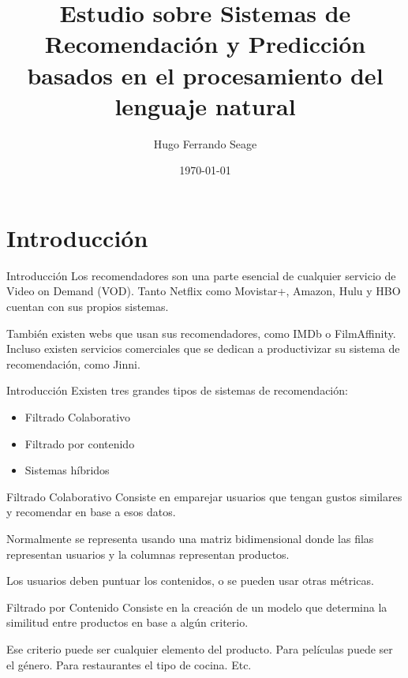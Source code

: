 \documentclass[table]{beamer}
\title{Estudio sobre Sistemas de Recomendación y Predicción basados en el procesamiento del lenguaje natural}
\date{\today}
\author{Hugo Ferrando Seage}
\institute{Universidad Europea de Madrid\\Escuela de Arquitectura, Ingeniería y Diseño}
\begin{document}
  \maketitle

  \section{Introducción}
  \begin{frame}{Introducción}
      Los recomendadores son una parte esencial de cualquier servicio de Video on Demand (VOD). Tanto Netflix como Movistar+, Amazon, Hulu y HBO cuentan con sus propios sistemas.

      También existen webs que usan sus recomendadores, como IMDb o FilmAffinity. Incluso existen servicios comerciales que se dedican a productivizar su sistema de recomendación, como Jinni.
  \end{frame}

  \begin{frame}{Introducción}
      Existen tres grandes tipos de sistemas de recomendación:
      \begin{itemize}
          \item Filtrado Colaborativo
          \item Filtrado por contenido
          \item Sistemas híbridos
      \end{itemize}
  \end{frame}

  \begin{frame}{Filtrado Colaborativo}
      Consiste en emparejar usuarios que tengan gustos similares y recomendar en base a esos datos.

      Normalmente se representa usando una matriz bidimensional donde las filas representan usuarios y la columnas representan productos.

      Los usuarios deben puntuar los contenidos, o se pueden usar otras métricas.
  \end{frame}

  \begin{frame}{Filtrado por Contenido}
      Consiste en la creación de un modelo que determina la similitud entre productos en base a algún criterio.

      Ese criterio puede ser cualquier elemento del producto. Para películas puede ser el género. Para restaurantes el tipo de cocina. Etc.
  \end{frame}
\end{document}
